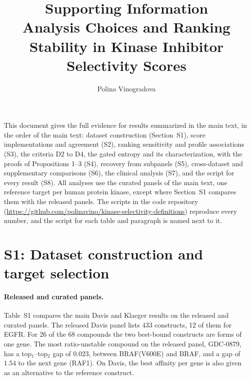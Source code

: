 \documentclass[11pt]{article}
\title{Supporting Information\\[0.3em]
  \large Analysis Choices and Ranking Stability in Kinase Inhibitor
  Selectivity Scores}
\author{Polina Vinogradova}
\date{}
\begin{document}
\sloppy
\maketitle

This document gives the full evidence for results summarized in the main text,
in the order of the main text: dataset construction (Section~S1), score
implementations and agreement (S2), ranking sensitivity and profile
associations (S3), the criteria D2 to D4, the gated entropy and its
characterization, with the proofs of Propositions 1--3 (S4),
recovery from subpanels (S5), cross-dataset and supplementary comparisons
(S6), the clinical analysis (S7), and the script for every result (S8).
All analyses use the curated panels of the main text, one reference target per
human protein kinase, except where Section~S1 compares them with the released
panels. The scripts in the code repository
(\url{https://github.com/polinavino/kinase-selectivity-definitions})
reproduce every number, and the script for each table and paragraph is
named next to it.

\section*{S1: Dataset construction and target selection}

\paragraph{Released and curated panels.} Table~S1 compares the main Davis and
Klaeger results on the released and curated panels. The released Davis panel
lists 433 constructs, 12 of them for EGFR. For 26 of the 68 compounds the two
best-bound constructs are forms of one gene. The most ratio-unstable compound
on the released panel, GDC-0879, has a top$_1$--top$_2$ gap of $0.023$, between
BRAF(V600E) and BRAF, and a gap of $1.54$ to the next gene (RAF1). On Davis,
the best affinity per gene is also given as an alternative to the reference
construct.
\end{document}
